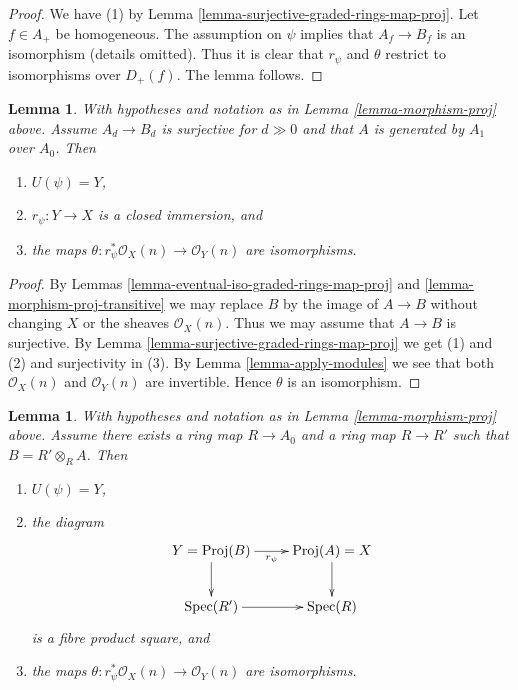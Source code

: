 \documentclass{stacks-project}
\newenvironment{reference}{\comment}{\endcomment}
\theoremstyle{plain}
\newtheorem{lemma}[subsection]{Lemma}
\theoremstyle{definition}
\theoremstyle{remark}
\numberwithin{equation}{subsection}
\def\Spec{\mathop{\mathrm{Spec}}}
\begin{document}
\begin{proof}
We have (1) by Lemma \ref{lemma-surjective-graded-rings-map-proj}.
Let $f \in A_{+}$ be homogeneous. The assumption on $\psi$ implies that
$A_f \to B_f$ is an isomorphism (details omitted). Thus it is clear that
$r_\psi$ and $\theta$ restrict to isomorphisms over $D_{+}(f)$.
The lemma follows.
\end{proof}

\begin{lemma}
\label{lemma-surjective-graded-rings-generated-degree-1-map-proj}
With hypotheses and notation as in Lemma \ref{lemma-morphism-proj} above.
Assume $A_d \to B_d$ is surjective for $d \gg 0$ and that $A$ is generated
by $A_1$ over $A_0$. Then
\begin{enumerate}
\item $U(\psi) = Y$,
\item $r_\psi : Y \to X$ is a closed immersion, and
\item the maps $\theta : r_\psi^*\mathcal{O}_X(n) \to \mathcal{O}_Y(n)$
are isomorphisms.
\end{enumerate}
\end{lemma}

\begin{proof}
By Lemmas \ref{lemma-eventual-iso-graded-rings-map-proj} and
\ref{lemma-morphism-proj-transitive}
we may replace $B$ by the image of $A \to B$
without changing $X$ or the sheaves $\mathcal{O}_X(n)$.
Thus we may assume that $A \to B$ is surjective. By
Lemma \ref{lemma-surjective-graded-rings-map-proj} we get (1) and (2)
and surjectivity in (3).
By Lemma \ref{lemma-apply-modules} we see that both
$\mathcal{O}_X(n)$ and $\mathcal{O}_Y(n)$
are invertible. Hence $\theta$ is an isomorphism.
\end{proof}

\begin{lemma}
\label{lemma-base-change-map-proj}
\begin{reference}
\cite[II, Proposition 2.8.10]{EGA}
\end{reference}
With hypotheses and notation as in Lemma \ref{lemma-morphism-proj} above.
Assume there exists a ring map $R \to A_0$ and a ring map
$R \to R'$ such that $B = R' \otimes_R A$. Then
\begin{enumerate}
\item $U(\psi) = Y$,
\item the diagram
$$
\xymatrix{
Y = \text{Proj}(B) \ar[r]_{r_\psi} \ar[d] &
\text{Proj}(A) = X \ar[d] \\
\Spec(R') \ar[r] &
\Spec(R)
}
$$
is a fibre product square, and
\item the maps $\theta : r_\psi^*\mathcal{O}_X(n) \to \mathcal{O}_Y(n)$
are isomorphisms.
\end{enumerate}
\end{lemma}
\end{document}
